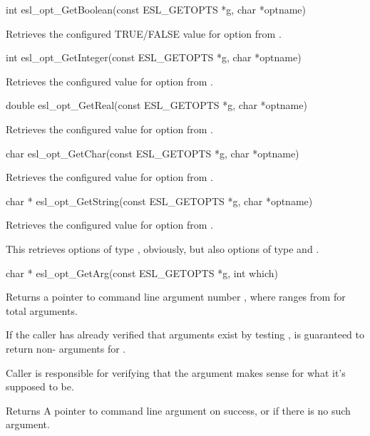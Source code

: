 \begin{sreapi}
\hypertarget{func:esl_opt_GetBoolean()}
{\item[int esl\_opt\_GetBoolean(const ESL\_GETOPTS *g, char *optname)]}

Retrieves the configured TRUE/FALSE value for option 
from .


\hypertarget{func:esl_opt_GetInteger()}
{\item[int esl\_opt\_GetInteger(const ESL\_GETOPTS *g, char *optname)]}

Retrieves the configured value for option 
from .


\hypertarget{func:esl_opt_GetReal()}
{\item[double esl\_opt\_GetReal(const ESL\_GETOPTS *g, char *optname)]}

Retrieves the configured value for option 
from .


\hypertarget{func:esl_opt_GetChar()}
{\item[char esl\_opt\_GetChar(const ESL\_GETOPTS *g, char *optname)]}

Retrieves the configured value for option 
from .


\hypertarget{func:esl_opt_GetString()}
{\item[char * esl\_opt\_GetString(const ESL\_GETOPTS *g, char *optname)]}

Retrieves the configured value for option 
from .

This retrieves options of type ,
obviously, but also options of type 
and .


\hypertarget{func:esl_opt_GetArg()}
{\item[char * esl\_opt\_GetArg(const ESL\_GETOPTS *g, int which)]}

Returns a pointer to command line argument number
, where  ranges from  for 
total arguments.

If the caller has already verified that  arguments
exist by testing ,
 is guaranteed to return non-
arguments for .

Caller is responsible for verifying that the argument
makes sense for what it's supposed to be.

Returns A pointer to command line argument  on success, or 
 if there is no such argument.



\end{sreapi}
